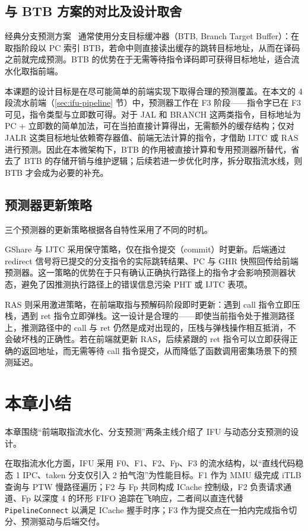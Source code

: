 \subsection{与 BTB 方案的对比及设计取舍}

经典分支预测方案~\cite{yao2014superscalar} 通常使用分支目标缓冲器（BTB, Branch Target Buffer）：在取指阶段以 PC 索引 BTB，若命中则直接读出缓存的跳转目标地址，从而在译码之前就完成预测。BTB 的优势在于无需等待指令译码即可获得目标地址，适合流水化取指前端。

本课题的设计目标是在尽可能简单的前端实现下取得合理的预测覆盖。在本文的 4 段流水前端（\ref{sec:ifu-pipeline} 节）中，预测器工作在 F3 阶段——指令字已在 F3 可见，指令类型与立即数可得。对于 JAL 和 BRANCH 这两类指令，目标地址为 PC + 立即数的简单加法，可在当拍直接计算得出，无需额外的缓存结构；仅对 JALR 这类目标地址依赖寄存器值、前端无法计算的指令，才借助 IJTC 或 RAS 进行预测。因此在本微架构下，BTB 的作用被直接计算和专用预测器所替代，省去了 BTB 的存储开销与维护逻辑；后续若进一步优化时序，拆分取指流水线，则 BTB 才会成为必要的补充。

\subsection{预测器更新策略}

三个预测器的更新策略根据各自特性采用了不同的时机。

GShare 与 IJTC 采用保守策略，仅在指令提交（commit）时更新。后端通过 redirect 信号将已提交的分支指令的实际跳转结果、PC 与 GHR 快照回传给前端预测器。这一策略的优势在于只有确认正确执行路径上的指令才会影响预测器状态，避免了因推测执行路径上的错误信息污染 PHT 或 IJTC 表项。

RAS 则采用激进策略，在前端取指与预解码阶段即时更新：遇到 call 指令立即压栈，遇到 ret 指令立即弹栈。这一设计是合理的——即使当前指令处于推测路径上，推测路径中的 call 与 ret 仍然是成对出现的，压栈与弹栈操作相互抵消，不会破坏栈的正确性。若在前端就更新 RAS，后续紧跟的 ret 指令可以立即获得正确的返回地址，而无需等待 call 指令提交，从而降低了函数调用密集场景下的预测延迟。

\section{本章小结}

本章围绕“前端取指流水化、分支预测”两条主线介绍了 IFU 与动态分支预测的设计。

在取指流水化方面，IFU 采用 F0、F1、F2、Fp、F3 的流水结构，以“直线代码稳态 1 IPC、taken 分支仅引入 2 拍气泡”为性能目标。F1 作为 MMU 级完成 iTLB 查询与 PTW 慢路径遍历；F2 与 Fp 共同构成 ICache 控制级，F2 负责请求通道、Fp 以深度 4 的环形 FIFO 追踪在飞响应，二者间以直连代替 \lstinline|PipelineConnect| 以满足 ICache 握手时序；F3 作为提交点在一拍内完成指令切分、预测驱动与后端交付。

